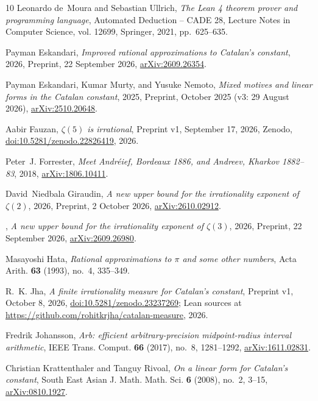 \documentclass[11pt]{amsart}
\theoremstyle{definition}
\theoremstyle{remark}
\numberwithin{equation}{section}
\begin{document}
\begin{thebibliography}{10}
Leonardo de~Moura and Sebastian Ullrich, \emph{The {L}ean 4 theorem prover and
  programming language}, Automated Deduction -- CADE 28, Lecture Notes in
  Computer Science, vol. 12699, Springer, 2021, pp.~625--635.

Payman Eskandari, \emph{Improved rational approximations to {C}atalan's
  constant}, 2026, Preprint, 22 September 2026,
  \href{https://arxiv.org/abs/2609.26354}{arXiv:2609.26354}.

Payman Eskandari, Kumar Murty, and Yusuke Nemoto, \emph{Mixed motives and
  linear forms in the {C}atalan constant}, 2025, Preprint, October 2025 (v3: 29
  August 2026), \href{https://arxiv.org/abs/2510.20648}{arXiv:2510.20648}.

Aabir Fauzan, \emph{{$\zeta(5)$} is irrational}, Preprint v1, September 17,
  2026, Zenodo,
  \href{https://doi.org/10.5281/zenodo.22826419}{doi:10.5281/zenodo.22826419},
  2026.

Peter~J. Forrester, \emph{Meet {A}ndr\'eief, {B}ordeaux 1886, and {A}ndreev,
  {K}harkov 1882--83}, 2018,
  \href{https://arxiv.org/abs/1806.10411}{arXiv:1806.10411}.

David~Niedbala Giraudin, \emph{A new upper bound for the irrationality exponent
  of {$\zeta(2)$}}, 2026, Preprint, 2 October 2026,
  \href{https://arxiv.org/abs/2610.02912}{arXiv:2610.02912}.

\bysame, \emph{A new upper bound for the irrationality exponent of
  {$\zeta(3)$}}, 2026, Preprint, 22 September 2026,
  \href{https://arxiv.org/abs/2609.26980}{arXiv:2609.26980}.

Masayoshi Hata, \emph{Rational approximations to {$\pi$} and some other
  numbers}, Acta Arith. \textbf{63} (1993), no.~4, 335--349.

R.~K. Jha, \emph{A finite irrationality measure for {C}atalan's constant},
  Preprint v1, October 8, 2026,
  \href{https://doi.org/10.5281/zenodo.23237269}{doi:10.5281/zenodo.23237269};
  Lean sources at \url{https://github.com/rohitkrjha/catalan-measure}, 2026.

Fredrik Johansson, \emph{Arb: efficient arbitrary-precision midpoint-radius
  interval arithmetic}, IEEE Trans. Comput. \textbf{66} (2017), no.~8,
  1281--1292, \href{https://arxiv.org/abs/1611.02831}{arXiv:1611.02831}.

Christian Krattenthaler and Tanguy Rivoal, \emph{On a linear form for
  {C}atalan's constant}, South East Asian J. Math. Math. Sci. \textbf{6}
  (2008), no.~2, 3--15,
  \href{https://arxiv.org/abs/0810.1927}{arXiv:0810.1927}.


\end{thebibliography}
\end{document}
